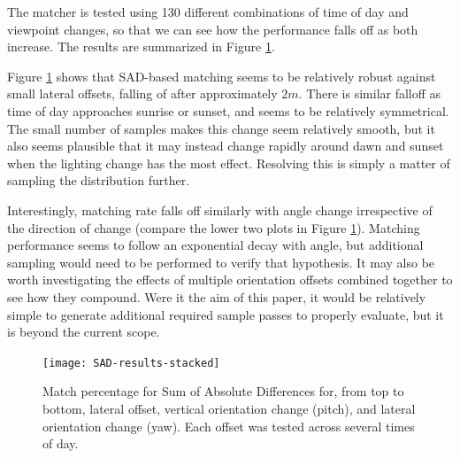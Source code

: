 \documentclass[letterpaper, 10 pt, conference]{ieeeconf}  %
\begin{document}
The matcher is tested using 130 different combinations of time of day and viewpoint changes, so that we can see how the performance falls off as both increase. The results are summarized in Figure \ref{fig:sad-results-stacked}.

Figure \ref{fig:sad-results-stacked} shows that SAD-based matching seems to be relatively robust against small lateral offsets, falling of after approximately $2m$. There is similar falloff as time of day approaches sunrise or sunset, and seems to be relatively symmetrical. The small number of samples makes this change seem relatively smooth, but it also seems plausible that it may instead change rapidly around dawn and sunset when the lighting change has the most effect. Resolving this is simply a matter of sampling the distribution further.

Interestingly, matching rate falls off similarly with angle change irrespective of the direction of change (compare the lower two plots in Figure \ref{fig:sad-results-stacked}). Matching performance seems to follow an exponential decay with angle, but additional sampling would need to be performed to verify that hypothesis. It may also be worth investigating the effects of multiple orientation offsets combined together to see how they compound. Were it the aim of this paper, it would be relatively simple to generate additional required sample passes to properly evaluate, but it is beyond the current scope.

\begin{figure}[ht]
    \centering
    \texttt{[image: SAD-results-stacked]}
    \caption{Match percentage for Sum of Absolute Differences for, from top to bottom, lateral offset, vertical orientation change (pitch), and lateral orientation change (yaw). Each offset was tested across several times of day.}
    \label{fig:sad-results-stacked}
\end{figure}


\end{document}
